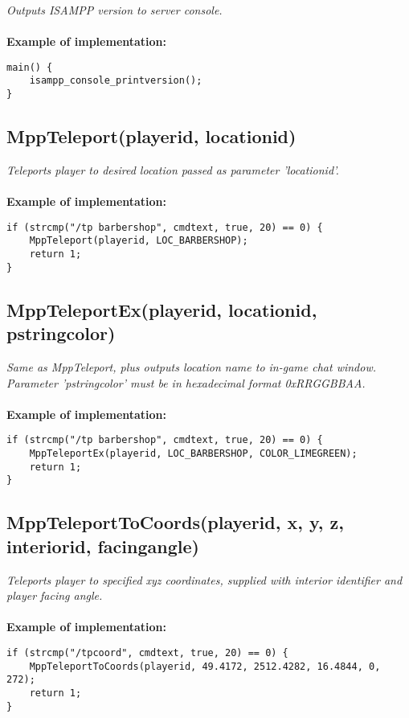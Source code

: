 \documentclass{article}
\begin{document}
\textit{Outputs ISAMPP version to server console.}
\\
\\
\textbf{Example of implementation:}
\begin{verbatim}
main() {
    isampp_console_printversion();
}
\end{verbatim}



\subsection{MppTeleport(playerid, locationid)}

\textit{Teleports player to desired location passed as parameter 'locationid'.}
\\
\\
\textbf{Example of implementation:}
\begin{verbatim}
if (strcmp("/tp barbershop", cmdtext, true, 20) == 0) {
    MppTeleport(playerid, LOC_BARBERSHOP);
    return 1;
}
\end{verbatim}


\subsection{MppTeleportEx(playerid, locationid, pstringcolor)}

\textit{Same as MppTeleport, plus outputs location name to in-game chat window. \\Parameter 'pstringcolor' must be in hexadecimal format 0xRRGGBBAA.}
\\
\\
\textbf{Example of implementation:}
\begin{verbatim}
if (strcmp("/tp barbershop", cmdtext, true, 20) == 0) {
    MppTeleportEx(playerid, LOC_BARBERSHOP, COLOR_LIMEGREEN);
    return 1;
}
\end{verbatim}


\subsection{MppTeleportToCoords(playerid, x, y, z, interiorid, facingangle)}

\textit{Teleports player to specified xyz coordinates, supplied with interior identifier and player facing angle.}
\\
\\
\textbf{Example of implementation:}
\begin{verbatim}
if (strcmp("/tpcoord", cmdtext, true, 20) == 0) {
    MppTeleportToCoords(playerid, 49.4172, 2512.4282, 16.4844, 0, 272);
    return 1;
}
\end{verbatim}
\end{document}
